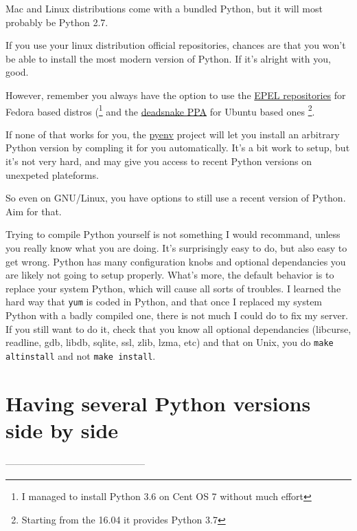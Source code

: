 \begin{warning}
    Mac and Linux distributions come with a bundled Python, but it will most probably be Python 2.7.
\end{warning}

If you use your linux distribution official repositories, chances are that you won't be able to install the most modern version of Python. If it's alright with you, good.

However, remember you always have the option to use the \href{https://fedoraproject.org/wiki/EPEL}{EPEL repositories} for Fedora based distros (\footnote{I managed to install Python 3.6 on Cent OS 7 without much effort} and the \href{https://launchpad.net/~deadsnakes/+archive/ubuntu/ppa}{deadsnake PPA} for Ubuntu based ones \footnote{Starting from the 16.04 it provides Python 3.7}.

If none of that works for you, the \href{https://github.com/pyenv/pyenv}{pyenv} project will let you install an arbitrary Python version by compling it for you automatically. It's a bit work to setup, but it's not very hard, and may give you access to recent Python versions on unexpeted plateforms.

So even on GNU/Linux, you have options to still use a recent version of Python. Aim for that.

\begin{warning}
    Trying to compile Python yourself is not something I would recommand, unless you really know what you are doing. It's surprisingly easy to do, but also easy to get wrong. Python has many configuration knobs and optional dependancies you are likely not going to setup properly. What's more, the default behavior is to replace your system Python, which will cause all sorts of troubles. I learned the hard way that \lstinline{yum} is coded in Python, and that once I replaced my system Python with a badly compiled one, there is not much I could do to fix my server. If you still want to do it, check that you know all optional dependancies (libcurse, readline, gdb, libdb, sqlite, ssl, zlib, lzma, etc) and that on Unix, you do \lstinline{make altinstall} and not \lstinline{make install}.
\end{warning}

\section{Having several Python versions side by side}
--------------------------------------------

